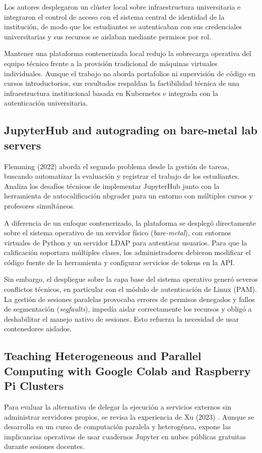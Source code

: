 Los autores desplegaron un clúster local sobre infraestructura universitaria e integraron el control de acceso con el sistema central de identidad de la institución, de modo que los estudiantes se autenticaban con sus credenciales universitarias y sus recursos se aislaban mediante permisos por rol.

Mantener una plataforma contenerizada local redujo la sobrecarga operativa del equipo técnico frente a la provisión tradicional de máquinas virtuales individuales. Aunque el trabajo no aborda portafolios ni supervisión de código en cursos introductorios, sus resultados respaldan la factibilidad técnica de una infraestructura institucional basada en Kubernetes e integrada con la autenticación universitaria.

\subsection{JupyterHub and autograding on bare-metal lab servers}
Flemming (2022) \cite{flemming2022jupyterhub} aborda el segundo problema desde la gestión de tareas, buscando automatizar la evaluación y registrar el trabajo de los estudiantes. Analiza los desafíos técnicos de implementar JupyterHub junto con la herramienta de autocalificación nbgrader para un entorno con múltiples cursos y profesores simultáneos.

A diferencia de un enfoque contenerizado, la plataforma se desplegó directamente sobre el sistema operativo de un servidor físico (\textit{bare-metal}), con entornos virtuales de Python y un servidor LDAP para autenticar usuarios. Para que la calificación soportara múltiples clases, los administradores debieron modificar el código fuente de la herramienta y configurar servicios de tokens en la API.

Sin embargo, el despliegue sobre la capa base del sistema operativo generó severos conflictos técnicos, en particular con el módulo de autenticación de Linux (PAM). La gestión de sesiones paralelas provocaba errores de permisos denegados y fallos de segmentación (\textit{segfaults}), impedía aislar correctamente los recursos y obligó a deshabilitar el manejo nativo de sesiones. Esto refuerza la necesidad de usar contenedores aislados.

\subsection{Teaching Heterogeneous and Parallel Computing with Google Colab and Raspberry Pi Clusters}
Para evaluar la alternativa de delegar la ejecución a servicios externos sin administrar servidores propios, se revisa la experiencia de Xu (2023) \cite{xu2023teaching}. Aunque se desarrolla en un curso de computación paralela y heterogénea, expone las implicancias operativas de usar cuadernos Jupyter en nubes públicas gratuitas durante sesiones docentes.

